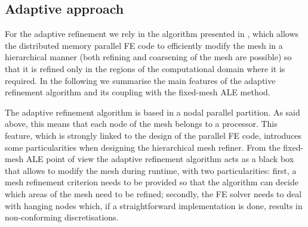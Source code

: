 \documentclass[11pt,a4paper,oneside,reqno]{amsart}
\begin{document}
\subsection{Adaptive approach}

For the adaptive refinement we rely in the algorithm presented in
\cite{baiges:siam_jsc17}, which allows the distributed memory parallel
FE code to efficiently modify the mesh in a hierarchical
manner (both refining and coarsening of the mesh are possible) so
that it is refined only in the regions of the computational domain
where it is required. In the following we summarise the main features
of the adaptive refinement algorithm and its coupling with the fixed-mesh ALE method.

The adaptive refinement algorithm is based in a nodal parallel partition. As said above,
this means that each node of the mesh belongs to a processor. This feature, which is strongly linked to
the design of the parallel FE code, introduces some particularities
when designing the hierarchical mesh refiner. From the fixed-mesh
ALE point of view the adaptive refinement algorithm acts as a black
box that allows to modify the mesh during runtime, with two particularities:
first, a mesh refinement criterion needs to be provided so that the
algorithm can decide which areas of the mesh need to be refined; secondly,
the FE solver needs to deal with hanging nodes which,
if a straightforward implementation is done, results in non-conforming
discretisations.
\end{document}
